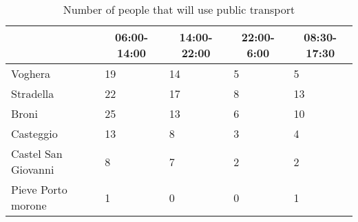 \begin{table}[h]
\centering
\begin{tabular}{|l|l|l|l|l|}
\hline
\rowcolor{bluepoli!40}
\multicolumn{1}{|c|}{\textbf{Municipality}} & \multicolumn{1}{c|}{\textbf{06:00-14:00}} & \multicolumn{1}{c|}{\textbf{14:00-22:00}} & \multicolumn{1}{c|}{\textbf{22:00-6:00}} & \multicolumn{1}{c|}{\textbf{08:30-17:30}} \\ \hline
Voghera                                     & 19                                        & 14                                        & 5                                        & 5                                         \\ \hline
Stradella                                   & 22                                        & 17                                        & 8                                        & 13                                        \\ \hline
Broni                                       & 25                                        & 13                                        & 6                                        & 10                                        \\ \hline
Casteggio                                   & 13                                        & 8                                         & 3                                        & 4                                         \\ \hline
Castel San Giovanni                         & 8                                         & 7                                         & 2                                        & 2                                         \\ \hline
Pieve   Porto morone                        & 1                                         & 0                                         & 0                                        & 1                                         \\ \hline
\end{tabular}
\caption{Number of people that will use public transport}
\label{tab:transportcount}
\end{table}

